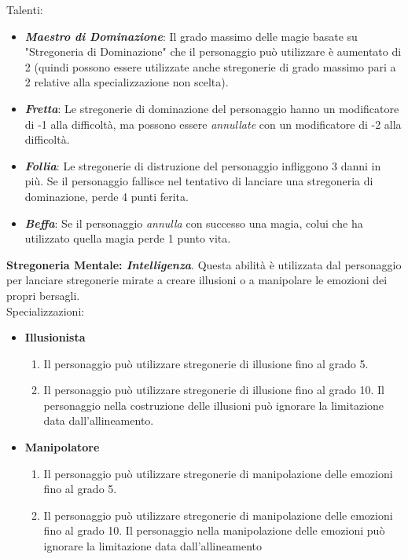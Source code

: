 \documentclass[../manuale_main.tex]{subfiles}
\begin{document}
Talenti:

\begin{itemize}
\item \textbf{\textit{Maestro di Dominazione}}: Il grado massimo delle magie basate su "Stregoneria di Dominazione" che il personaggio può utilizzare è aumentato di 2 (quindi possono essere utilizzate anche stregonerie di grado massimo pari a 2 relative alla specializzazione non scelta).
\item \textbf{\textit{Fretta}}: Le stregonerie di dominazione del personaggio hanno un modificatore di -1 alla difficoltà, ma possono essere \textit{annullate} con un modificatore di -2 alla difficoltà.
\item \textbf{\textit{Follia}}: Le stregonerie di distruzione del personaggio infliggono 3 danni in più. Se il personaggio fallisce nel tentativo di lanciare una stregoneria di dominazione, perde 4 punti ferita.
\item \textbf{\textit{Beffa}}: Se il personaggio \textit{annulla} con successo una magia, colui che ha utilizzato quella magia perde 1 punto vita.
\end{itemize}

\textbf{Stregoneria Mentale: \textit{Intelligenza}}. Questa abilità è utilizzata dal personaggio per lanciare stregonerie mirate a creare illusioni o a manipolare le emozioni dei propri bersagli.
\\Specializzazioni:

\begin{itemize} 
\item\textbf{Illusionista}
\begin{enumerate}
\item Il personaggio può utilizzare stregonerie di illusione fino al grado 5.
\item Il personaggio può utilizzare stregonerie di illusione fino al grado 10. Il personaggio nella costruzione delle illusioni può ignorare la limitazione data dall'allineamento.

\end{enumerate}

\item\textbf{Manipolatore}
\begin{enumerate}
\item Il personaggio può utilizzare stregonerie di manipolazione delle emozioni fino al grado 5.
\item Il personaggio può utilizzare stregonerie di manipolazione delle emozioni fino al grado 10. Il personaggio nella manipolazione delle emozioni può ignorare la limitazione data dall'allineamento

\end{enumerate}
\end{itemize}
\end{document}
